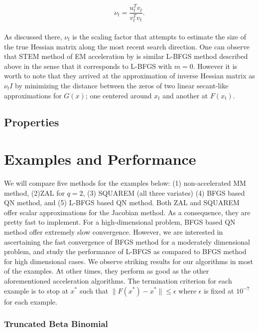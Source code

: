 \documentclass[12pt]{article}
\newcommand{\jx}[1]{{\color{blue}{ #1}}}
\begin{document}
\[
 \nu_t = \dfrac{u_{t}^T v_{t}}{v_{t}^T v_{t}}.
\]
\\
As discussed there, $\nu_t$ is the scaling factor that attempts to estimate the size of the true Hessian matrix along the most recent search direction. One can observe that STEM method of EM acceleration by \cite{varadhan2008simple} is similar L-BFGS method described above in the sense that it corresponds to L-BFGS with $m=0$. However it is worth to note that they arrived at the approximation of inverse Hessian matrix as $\nu_t I$ by minimizing the distance between the zeros of two linear secant-like approximations for $G(x)$; one centered around $x_t$ and another at $F(x_t)$.

\subsection{Properties}
\jx{Add remark that this respects/preserves any linear constraints that may have originally been enforced. Add convergence results or highlight existing theorems that can apply under appropriate assumptions}

\section{Examples and Performance} \label{subsec:BFGSex}

We will compare five methods for the examples below: (1) non-accelerated MM method, (2)ZAL for $q = 2$, (3) SQUAREM (all three variates) (4) BFGS based QN method, and (5) L-BFGS based QN method. Both ZAL and SQUAREM offer scalar approximations for the Jacobian method. As a consequence, they are pretty fast to implement. For a high-dimensional problem, BFGS based QN method offer extremely slow convergence. However, we are interested in ascertaining the fast convergence of BFGS method for a moderately dimensional problem, and study the performance of L-BFGS as compared to BFGS method for high dimensional cases. We observe striking results for our algorithms in most of the examples. At other times, they perform as good as the other aforementioned acceleration algorithms. The termination criterion for each example is to stop at $x^*$ such that $\|F(x^*) - x^*\| \leq \epsilon$ where $\epsilon$ is fixed at $10^{-7}$ for each example. 

\subsubsection{Truncated Beta Binomial} \label{ex:trunc.beta.binom}
\end{document}
